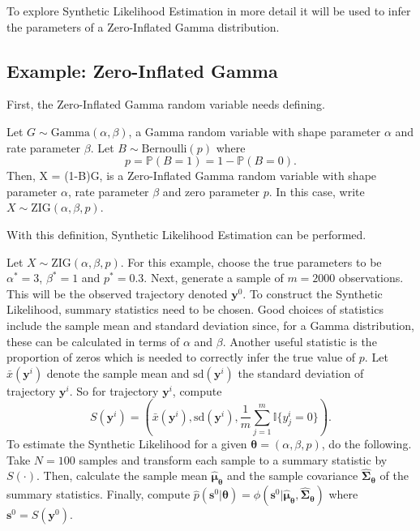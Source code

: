 To explore Synthetic Likelihood Estimation in more detail it will be used to infer the parameters of a Zero-Inflated Gamma distribution.

\subsection{Example: Zero-Inflated Gamma}
\label{subsec:gamma}

First, the Zero-Inflated Gamma random variable needs defining.

\begin{definition}
    Let $G \sim \text{Gamma}(\alpha, \beta)$, a Gamma random variable with shape parameter $\alpha$ and rate parameter $\beta$. Let $B \sim \text{Bernoulli}(p)$ where
    \[ p = \mathbb{P}(B = 1) = 1 - \mathbb{P}(B = 0). \]
    Then, X = (1-B)G, is a Zero-Inflated Gamma random variable with shape parameter $\alpha$, rate parameter $\beta$ and zero parameter $p$. In this case, write $X \sim \text{ZIG}(\alpha, \beta, p)$.
\end{definition}

With this definition, Synthetic Likelihood Estimation can be performed.

Let $X \sim \text{ZIG}(\alpha, \beta, p)$. For this example, choose the true parameters to be $\alpha^* = 3$, $\beta^* = 1$ and $p^* = 0.3$. Next, generate a sample of $m = 2000$ observations. This will be the observed trajectory denoted $\pmb{y}^0$. To construct the Synthetic Likelihood, summary statistics need to be chosen. Good choices of statistics include the sample mean and standard deviation since, for a Gamma distribution, these can be calculated in terms of $\alpha$ and $\beta$. Another useful statistic is the proportion of zeros which is needed to correctly infer the true value of $p$. Let $\bar{x}(\pmb{y}^i)$ denote the sample mean and $\text{sd}(\pmb{y}^i)$ the standard deviation of trajectory $\pmb{y}^i$. So for trajectory $\pmb{y}^i$, compute
\begin{equation}
S(\pmb{y}^i) = (\bar{x}(\pmb{y}^i), \text{sd}(\pmb{y}^i), \frac{1}{m}\sum_{j=1}^m \mathbb{I}\{y^i_j = 0\}).
\end{equation}
To estimate the Synthetic Likelihood for a given $\pmb{\theta} = (\alpha, \beta, p)$, do the following. Take $N=100$ samples and transform each sample to a summary statistic by $S(\cdot)$. Then, calculate the sample mean $\hat{\pmb{\mu}}_{\pmb{\theta}}$ and the sample covariance $\hat{\pmb{\Sigma}}_{\pmb{\theta}}$ of the summary statistics. Finally, compute $\hat{p}(\pmb{s}^0 | \pmb{\theta}) = \phi(\pmb{s}^0 | \hat{\pmb{\mu}}_{\pmb{\theta}}, \hat{\pmb{\Sigma}}_{\pmb{\theta}})$ where $\pmb{s}^0 = S(\pmb{y}^0)$.

